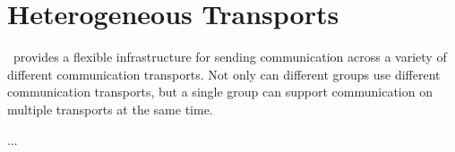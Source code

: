 %
%
%
\section{Heterogeneous Transports}

\ensemble\ provides a flexible infrastructure for sending communication
across a variety of different communication transports.  Not only can
different groups use different communication transports, but a single group
can support communication on multiple transports at the same time.

...

